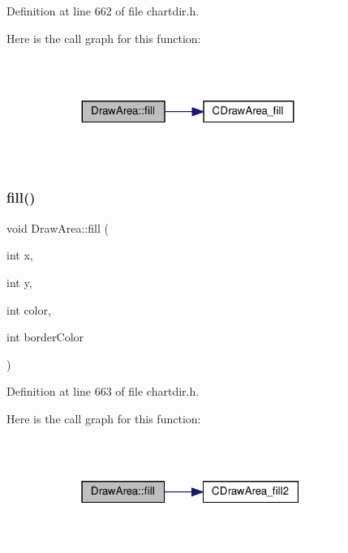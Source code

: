 Definition at line 662 of file chartdir.\+h.

Here is the call graph for this function\+:
\nopagebreak
\begin{figure}[H]
\begin{center}
\leavevmode
\includegraphics[width=275pt]{class_draw_area_a4d6f312431ecd2a7d790f216a711a72f_cgraph}
\end{center}
\end{figure}
\mbox{\label{class_draw_area_a5345909a5bf641aad100867bd889e837}} 
\subsubsection{\texorpdfstring{fill()}{fill()}\hspace{0.1cm}{\footnotesize\ttfamily [2/2]}}
{\footnotesize\ttfamily void Draw\+Area\+::fill (\begin{DoxyParamCaption}\item[{int}]{x,  }\item[{int}]{y,  }\item[{int}]{color,  }\item[{int}]{border\+Color }\end{DoxyParamCaption})\hspace{0.3cm}{\ttfamily [inline]}}



Definition at line 663 of file chartdir.\+h.

Here is the call graph for this function\+:
\nopagebreak
\begin{figure}[H]
\begin{center}
\leavevmode
\includegraphics[width=280pt]{class_draw_area_a5345909a5bf641aad100867bd889e837_cgraph}
\end{center}
\end{figure}
\mbox{\label{class_draw_area_a5636e0e893a7c9a40f76a3564bd59db9}} 
